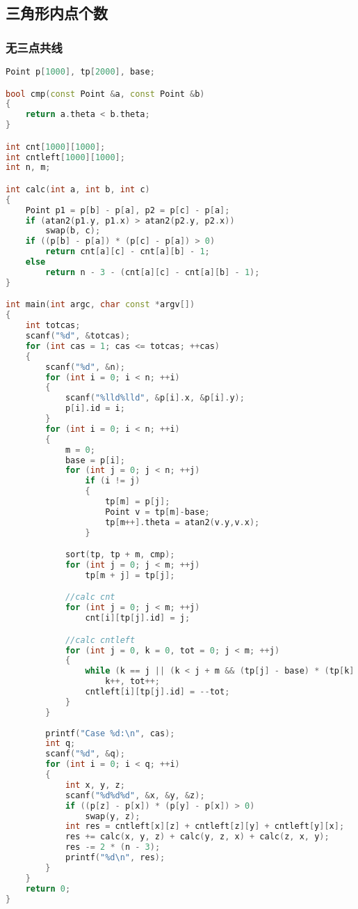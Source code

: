 \subsection{三角形内点个数}
    \subsubsection{无三点共线}
	\begin{lstlisting}[language=c++]
Point p[1000], tp[2000], base;

bool cmp(const Point &a, const Point &b)
{
	return a.theta < b.theta;
}

int cnt[1000][1000];
int cntleft[1000][1000];
int n, m;

int calc(int a, int b, int c)
{
    Point p1 = p[b] - p[a], p2 = p[c] - p[a];
    if (atan2(p1.y, p1.x) > atan2(p2.y, p2.x))
        swap(b, c);
    if ((p[b] - p[a]) * (p[c] - p[a]) > 0)
        return cnt[a][c] - cnt[a][b] - 1;
    else
        return n - 3 - (cnt[a][c] - cnt[a][b] - 1);
}

int main(int argc, char const *argv[])
{
    int totcas;
    scanf("%d", &totcas);
    for (int cas = 1; cas <= totcas; ++cas)
    {
        scanf("%d", &n);
        for (int i = 0; i < n; ++i)
        {
            scanf("%lld%lld", &p[i].x, &p[i].y);
            p[i].id = i;
        }
        for (int i = 0; i < n; ++i)
        {
            m = 0;
            base = p[i];
            for (int j = 0; j < n; ++j)
                if (i != j)
                {
                    tp[m] = p[j];
                    Point v = tp[m]-base;
                    tp[m++].theta = atan2(v.y,v.x);
                }

            sort(tp, tp + m, cmp);
            for (int j = 0; j < m; ++j)
                tp[m + j] = tp[j];

            //calc cnt
            for (int j = 0; j < m; ++j)
                cnt[i][tp[j].id] = j;

            //calc cntleft
            for (int j = 0, k = 0, tot = 0; j < m; ++j)
            {
                while (k == j || (k < j + m && (tp[j] - base) * (tp[k] - base) > 0))
                    k++, tot++;
                cntleft[i][tp[j].id] = --tot;
            }
        }
        
        printf("Case %d:\n", cas);
        int q;
        scanf("%d", &q);
        for (int i = 0; i < q; ++i)
        {
            int x, y, z;
            scanf("%d%d%d", &x, &y, &z);
            if ((p[z] - p[x]) * (p[y] - p[x]) > 0)
                swap(y, z);
            int res = cntleft[x][z] + cntleft[z][y] + cntleft[y][x];
            res += calc(x, y, z) + calc(y, z, x) + calc(z, x, y);
            res -= 2 * (n - 3);
            printf("%d\n", res);
        }
    }
    return 0;
}
	\end{lstlisting}
	
